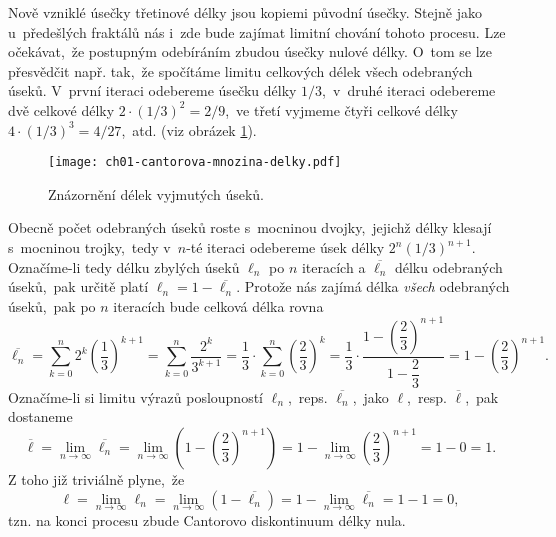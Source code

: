 Nově vzniklé úsečky třetinové délky jsou kopiemi původní úsečky. Stejně jako u~předešlých fraktálů nás i~zde bude zajímat limitní chování tohoto procesu. Lze očekávat,~že postupným odebíráním zbudou úsečky nulové délky. O~tom se lze přesvědčit např. tak,~že spočítáme limitu celkových délek všech odebraných úseků. V~první iteraci odebereme úsečku délky $1/3$,~v~druhé iteraci odebereme dvě celkové délky $2\cdot(1/3)^2=2/9$,~ve třetí vyjmeme čtyři celkové délky $4\cdot(1/3)^3=4/27$,~atd. (viz obrázek \ref{fig:cantorovo_diskontinuum_delky}).
\begin{figure}[h]
    \centering
    \texttt{[image: ch01-cantorova-mnozina-delky.pdf]}
    \caption{Znázornění délek vyjmutých úseků.}
    \label{fig:cantorovo_diskontinuum_delky}
\end{figure}
Obecně počet odebraných úseků roste s~mocninou dvojky,~jejichž délky klesají s~mocninou trojky,~tedy v~$n$-té iteraci odebereme úsek délky $2^n(1/3)^{n+1}$. Označíme-li tedy délku zbylých úseků $\ell_n$ po $n$ iteracích a $\overline{\ell_n}$ délku odebraných úseků,~pak určitě platí $\ell_n=1-\overline{\ell_n}$. Protože nás zajímá délka \emph{všech} odebraných úseků,~pak po $n$ iteracích bude celková délka rovna
\begin{equation}
    \overline{\ell_n}=\sum_{k=0}^{n}2^k\left(\dfrac{1}{3}\right)^{k+1}=\sum_{k=0}^{n}\dfrac{2^k}{3^{k+1}}=\dfrac{1}{3}\cdot\sum_{k=0}^{n}\left(\dfrac{2}{3}\right)^k=\dfrac{1}{3}\cdot\dfrac{1-\left(\dfrac{2}{3}\right)^{n+1}}{1-\dfrac{2}{3}}=1-\left(\dfrac{2}{3}\right)^{n+1}.
\end{equation}
Označíme-li si limitu výrazů posloupností $\ell_n$,~reps. $\overline{\ell_n}$,~jako $\ell$,~resp. $\overline{\ell}$,~pak dostaneme
\begin{equation*}
    \overline{\ell}=\lim_{n\to\infty}\overline{\ell_n}=\lim_{n\to\infty}\left(1-\left(\dfrac{2}{3}\right)^{n+1}\right)=1-\lim_{n\to\infty}\left(\dfrac{2}{3}\right)^{n+1}=1-0=1.
\end{equation*}
Z toho již triviálně plyne,~že
\begin{equation}
    \ell=\lim_{n\to\infty}\ell_n=\lim_{n\to\infty}(1-\overline{\ell_n})=1-\lim_{n\to\infty}\overline{\ell_n}=1-1=0,
\end{equation}
tzn. na konci procesu zbude Cantorovo diskontinuum délky nula.